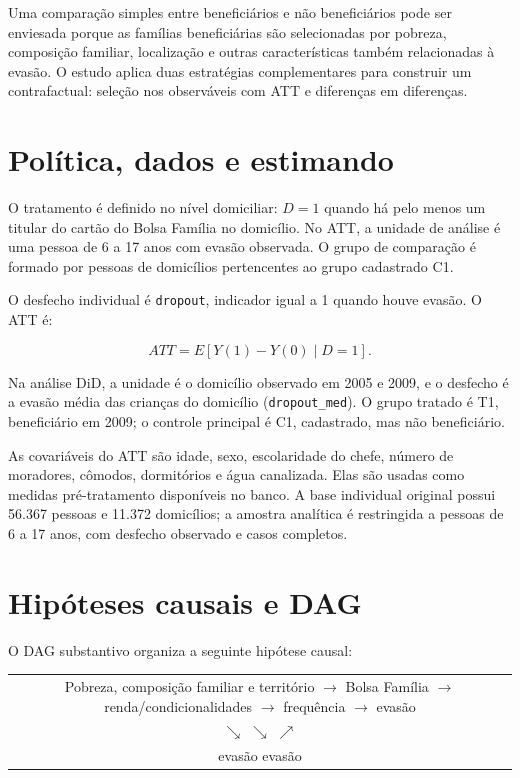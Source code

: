 \documentclass[12pt,a4paper]{article}
\begin{document}
Uma comparação simples entre beneficiários e não beneficiários pode ser enviesada porque as famílias beneficiárias são selecionadas por pobreza, composição familiar, localização e outras características também relacionadas à evasão. O estudo aplica duas estratégias complementares para construir um contrafactual: seleção nos observáveis com ATT e diferenças em diferenças.

\section{Política, dados e estimando}

O tratamento é definido no nível domiciliar: $D=1$ quando há pelo menos um titular do cartão do Bolsa Família no domicílio. No ATT, a unidade de análise é uma pessoa de 6 a 17 anos com evasão observada. O grupo de comparação é formado por pessoas de domicílios pertencentes ao grupo cadastrado C1.

O desfecho individual é \texttt{dropout}, indicador igual a 1 quando houve evasão. O ATT é:

\begin{equation}
ATT = E[Y(1)-Y(0)\mid D=1].
\end{equation}

Na análise DiD, a unidade é o domicílio observado em 2005 e 2009, e o desfecho é a evasão média das crianças do domicílio (\texttt{dropout\_med}). O grupo tratado é T1, beneficiário em 2009; o controle principal é C1, cadastrado, mas não beneficiário.

As covariáveis do ATT são idade, sexo, escolaridade do chefe, número de moradores, cômodos, dormitórios e água canalizada. Elas são usadas como medidas pré-tratamento disponíveis no banco. A base individual original possui 56.367 pessoas e 11.372 domicílios; a amostra analítica é restringida a pessoas de 6 a 17 anos, com desfecho observado e casos completos.

\section{Hipóteses causais e DAG}

O DAG substantivo organiza a seguinte hipótese causal:

\begin{center}
\begin{tabular}{c}
Pobreza, composição familiar e território $\longrightarrow$ Bolsa Família $\longrightarrow$ renda/condicionalidades $\longrightarrow$ frequência $\longrightarrow$ evasão \\
\hspace{1.2cm}$\searrow$ \hspace{3.4cm}$\searrow$ \hspace{4.8cm}$\nearrow$ \\
\hspace{2.0cm} evasão \hspace{2.8cm} evasão
\end{tabular}
\end{center}
\end{document}
